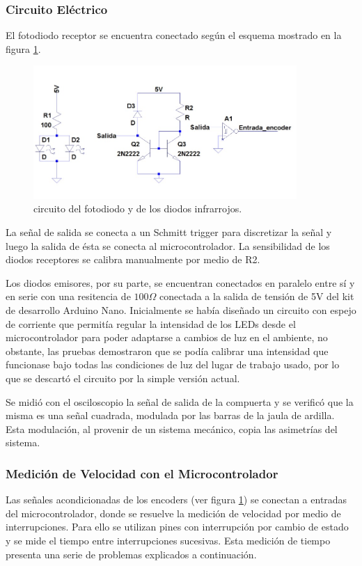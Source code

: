 \documentclass[10pt,conference,a4paper,onecolumn]{article}%
\begin{document}
\subsubsection{Circuito Eléctrico}
El fotodiodo receptor se encuentra conectado según el esquema mostrado en la figura \ref{fig:circuitoFotodiodo}.
\begin{figure}[h]
\centering
\includegraphics[width=10cm]{./imagenes/circuitoFotodiodo.jpeg}
\caption{circuito del fotodiodo y de los diodos infrarrojos.}
\label{fig:circuitoFotodiodo}
\end{figure}
La señal de salida se conecta a un Schmitt trigger para discretizar la señal y luego la salida de ésta se conecta al microcontrolador. La sensibilidad de los diodos receptores se calibra manualmente por medio de R2.

Los diodos emisores, por su parte, se encuentran conectados en paralelo entre sí y en serie con una resitencia de $100 \Omega$ conectada a la salida de tensión de 5V del kit de desarrollo Arduino Nano. Inicialmente se había diseñado un circuito con espejo de corriente que permitía regular la intensidad de los LEDs desde el microcontrolador para poder adaptarse a cambios de luz en el ambiente, no obstante, las pruebas demostraron que se podía calibrar una intensidad que funcionase bajo todas las condiciones de luz del lugar de trabajo usado, por lo que se descartó el circuito por la simple versión actual.

Se midió con el osciloscopio la señal de salida de la compuerta y se verificó que la misma es una señal cuadrada, modulada por las barras de la jaula de ardilla. Esta modulación, al provenir de un sistema mecánico, copia las asimetrías del sistema.

\subsubsection{Medición de Velocidad con el Microcontrolador}
Las señales acondicionadas de los encoders (ver figura \ref{fig:circuitoFotodiodo}) se conectan a entradas del microcontrolador, donde se resuelve la medición de velocidad por medio de interrupciones. Para ello se utilizan pines con interrupción
por cambio de estado y se mide el tiempo entre interrupciones sucesivas. Esta medición de tiempo presenta una serie de problemas explicados a continuación.
\end{document}
